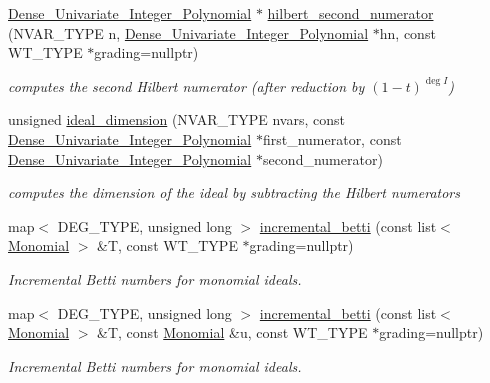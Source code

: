 \begin{DoxyCompactItemize}
\hyperlink{group__polygroup_class_dense___univariate___integer___polynomial}{Dense\+\_\+\+Univariate\+\_\+\+Integer\+\_\+\+Polynomial} $\ast$ \hyperlink{group__commalg_ga572e81ac2dce2e17ab459e9a0b687084}{hilbert\+\_\+second\+\_\+numerator} (N\+V\+A\+R\+\_\+\+T\+Y\+PE n, \hyperlink{group__polygroup_class_dense___univariate___integer___polynomial}{Dense\+\_\+\+Univariate\+\_\+\+Integer\+\_\+\+Polynomial} $\ast$hn, const W\+T\+\_\+\+T\+Y\+PE $\ast$grading=nullptr)
\begin{DoxyCompactList}\small\item\em computes the second Hilbert numerator (after reduction by $(1-t)^{\deg I}$) \end{DoxyCompactList}\item 
unsigned \hyperlink{group__commalg_ga53635c7ec7374da275c21eeb04c1e574}{ideal\+\_\+dimension} (N\+V\+A\+R\+\_\+\+T\+Y\+PE nvars, const \hyperlink{group__polygroup_class_dense___univariate___integer___polynomial}{Dense\+\_\+\+Univariate\+\_\+\+Integer\+\_\+\+Polynomial} $\ast$first\+\_\+numerator, const \hyperlink{group__polygroup_class_dense___univariate___integer___polynomial}{Dense\+\_\+\+Univariate\+\_\+\+Integer\+\_\+\+Polynomial} $\ast$second\+\_\+numerator)
\begin{DoxyCompactList}\small\item\em computes the dimension of the ideal by subtracting the Hilbert numerators \end{DoxyCompactList}\item 
map$<$ D\+E\+G\+\_\+\+T\+Y\+PE, unsigned long $>$ \hyperlink{group__commalg_gac808392f45282e90eb6ecfb5c14b5392}{incremental\+\_\+betti} (const list$<$ \hyperlink{group__polygroup_class_monomial}{Monomial} $>$ \&T, const W\+T\+\_\+\+T\+Y\+PE $\ast$grading=nullptr)
\begin{DoxyCompactList}\small\item\em Incremental Betti numbers for monomial ideals. \end{DoxyCompactList}\item 
map$<$ D\+E\+G\+\_\+\+T\+Y\+PE, unsigned long $>$ \hyperlink{group__commalg_ga0c0869fddcdc6498993507e6b4f88658}{incremental\+\_\+betti} (const list$<$ \hyperlink{group__polygroup_class_monomial}{Monomial} $>$ \&T, const \hyperlink{group__polygroup_class_monomial}{Monomial} \&u, const W\+T\+\_\+\+T\+Y\+PE $\ast$grading=nullptr)
\begin{DoxyCompactList}\small\item\em Incremental Betti numbers for monomial ideals. \end{DoxyCompactList}\item 

\end{DoxyCompactItemize}
